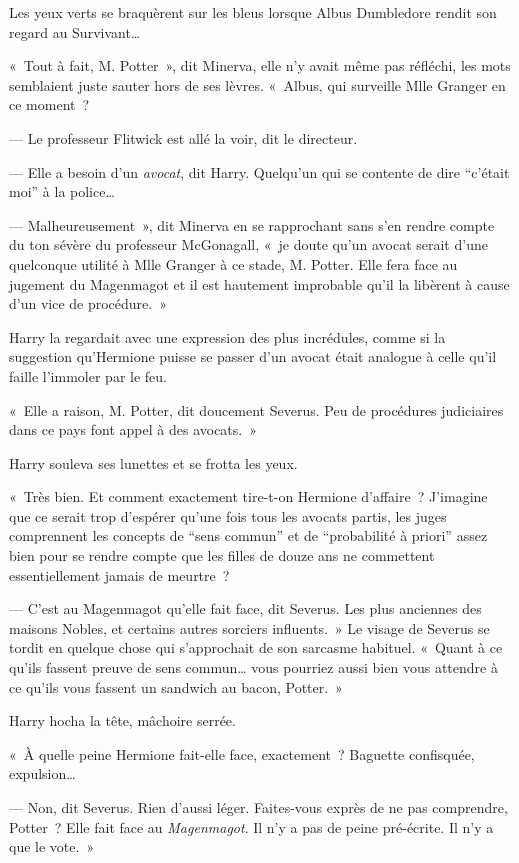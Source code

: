 Les yeux verts se braquèrent sur les bleus lorsque Albus Dumbledore rendit son regard au Survivant…

«~Tout à fait, M. Potter~», dit Minerva, elle n'y avait même pas réfléchi, les mots semblaient juste sauter hors de ses lèvres. «~Albus, qui surveille Mlle Granger en ce moment~?

--- Le professeur Flitwick est allé la voir, dit le directeur.

--- Elle a besoin d'un \emph{avocat}, dit Harry. Quelqu'un qui se contente de dire “c'était moi” à la police…

--- Malheureusement~», dit Minerva en se rapprochant sans s'en rendre compte du ton sévère du professeur McGonagall, «~je doute qu'un avocat serait d'une quelconque utilité à Mlle Granger à ce stade, M. Potter. Elle fera face au jugement du Magenmagot et il est hautement improbable qu'il la libèrent à cause d'un vice de procédure.~»

Harry la regardait avec une expression des plus incrédules, comme si la suggestion qu'Hermione puisse se passer d'un avocat était analogue à celle qu'il faille l'immoler par le feu.

«~Elle a raison, M. Potter, dit doucement Severus. Peu de procédures judiciaires dans ce pays font appel à des avocats.~»

Harry souleva ses lunettes et se frotta les yeux.

«~Très bien. Et comment exactement tire-t-on Hermione d'affaire~? J'imagine que ce serait trop d'espérer qu'une fois tous les avocats partis, les juges comprennent les concepts de “sens commun” et de “probabilité à priori” assez bien pour se rendre compte que les filles de douze ans ne commettent essentiellement jamais de meurtre~?

--- C'est au Magenmagot qu'elle fait face, dit Severus. Les plus anciennes des maisons Nobles, et certains autres sorciers influents.~» Le visage de Severus se tordit en quelque chose qui s'approchait de son sarcasme habituel. «~Quant à ce qu'ils fassent preuve de sens commun… vous pourriez aussi bien vous attendre à ce qu'ils vous fassent un sandwich au bacon, Potter.~»

Harry hocha la tête, mâchoire serrée.

«~À quelle peine Hermione fait-elle face, exactement~? Baguette confisquée, expulsion…

--- Non, dit Severus. Rien d'aussi léger. Faites-vous exprès de ne pas comprendre, Potter~? Elle fait face au \emph{Magenmagot}. Il n'y a pas de peine pré-écrite. Il n'y a que le vote.~»

